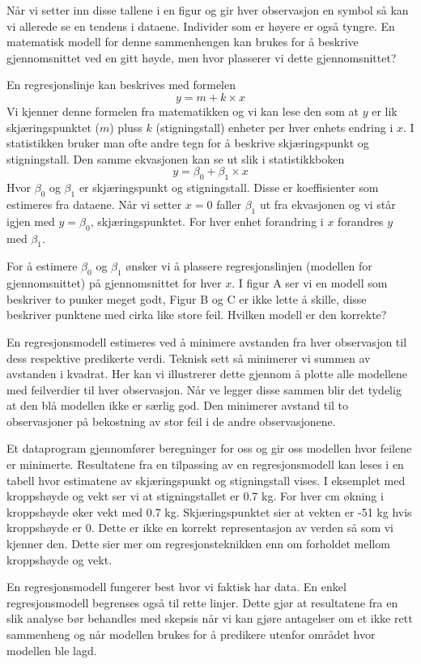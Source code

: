 \documentclass[
  letterpaper,
  DIV=11,
  numbers=noendperiod,
  oneside]{scrreprt}
\begin{document}
Når vi setter inn disse tallene i en figur og gir hver observasjon en
symbol så kan vi allerede se en tendens i dataene. Individer som er
høyere er også tyngre. En matematisk modell for denne sammenhengen kan
brukes for å beskrive gjennomsnittet ved en gitt høyde, men hvor
plasserer vi dette gjennomsnittet?

En regresjonslinje kan beskrives med formelen \[y=m + k\times x\] Vi
kjenner denne formelen fra matematikken og vi kan lese den som at \(y\)
er lik skjæringspunktet (\(m\)) pluss \(k\) (stigningstall) enheter per
hver enhets endring i \(x\). I statistikken bruker man ofte andre tegn
for å beskrive skjæringspunkt og stigningstall. Den samme ekvasjonen kan
se ut slik i statistikkboken \[y=\beta_0 + \beta_1 \times x\] Hvor
\(\beta_0\) og \(\beta_1\) er skjæringspunkt og stigningstall. Disse er
koeffisienter som estimeres fra dataene. Når vi setter \(x=0\) faller
\(\beta_1\) ut fra ekvasjonen og vi står igjen med \(y=\beta_0\),
skjæringspunktet. For hver enhet forandring i \(x\) forandres \(y\) med
\(\beta_1\).

For å estimere \(\beta_0\) og \(\beta_1\) ønsker vi å plassere
regresjonslinjen (modellen for gjennomsnittet) på gjennomsnittet for
hver \(x\). I figur A ser vi en modell som beskriver to punker meget
godt, Figur B og C er ikke lette å skille, disse beskriver punktene med
cirka like store feil. Hvilken modell er den korrekte?

En regresjonsmodell estimeres ved å minimere avstanden fra hver
observasjon til dess respektive predikerte verdi. Teknisk sett så
minimerer vi summen av avstanden i kvadrat. Her kan vi illustrerer dette
gjennom å plotte alle modellene med feilverdier til hver observasjon.
Når ve legger disse sammen blir det tydelig at den blå modellen ikke er
særlig god. Den minimerer avstand til to observasjoner på bekostning av
stor feil i de andre observasjonene.

Et dataprogram gjennomfører beregninger for oss og gir oss modellen hvor
feilene er minimerte. Resultatene fra en tilpassing av en
regresjonsmodell kan leses i en tabell hvor estimatene av skjæringspunkt
og stigningstall vises. I eksemplet med kroppshøyde og vekt ser vi at
stigningstallet er 0.7 kg. For hver cm økning i kroppshøyde øker vekt
med 0.7 kg. Skjæringspunktet sier at vekten er -51 kg hvis kroppshøyde
er 0. Dette er ikke en korrekt representasjon av verden så som vi
kjenner den. Dette sier mer om regresjonsteknikken enn om forholdet
mellom kroppshøyde og vekt.

En regresjonsmodell fungerer best hvor vi faktisk har data. En enkel
regresjonsmodell begrenses også til rette linjer. Dette gjør at
resultatene fra en slik analyse bør behandles med skepsis når vi kan
gjøre antagelser om et ikke rett sammenheng og når modellen brukes for å
predikere utenfor området hvor modellen ble lagd.
\end{document}

